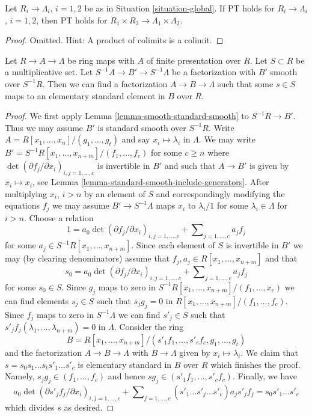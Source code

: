 \begin{lemma}
\label{lemma-product}
Let $R_i \to \Lambda_i$, $i = 1, 2$ be as in Situation \ref{situation-global}.
If PT holds for $R_i \to \Lambda_i$, $i = 1, 2$, then PT holds for
$R_1 \times R_2 \to \Lambda_1 \times \Lambda_2$.
\end{lemma}

\begin{proof}
Omitted. Hint: A product of colimits is a colimit.
\end{proof}

\begin{lemma}
\label{lemma-delocalize-base}
Let $R \to A \to \Lambda$ be ring maps with $A$ of finite presentation
over $R$. Let $S \subset R$ be a multiplicative
set. Let $S^{-1}A \to B' \to S^{-1}\Lambda$ be a factorization with
$B'$ smooth over $S^{-1}R$. Then we can find a factorization
$A \to B \to \Lambda$ such that some $s \in S$ maps to an elementary standard
element in $B$ over $R$.
\end{lemma}

\begin{proof}
We first apply Lemma \ref{lemma-smooth-standard-smooth} to $S^{-1}R \to B'$.
Thus we may assume $B'$ is standard smooth over $S^{-1}R$.
Write $A = R[x_1, \ldots, x_n]/(g_1, \ldots, g_t)$ and say
$x_i \mapsto \lambda_i$ in $\Lambda$. We may write
$B' = S^{-1}R[x_1, \ldots, x_{n + m}]/(f_1, \ldots, f_c)$
for some $c \geq n$ where
$\det(\partial f_j/\partial x_i)_{i, j = 1, \ldots, c}$
is invertible in $B'$ and such that $A \to B'$ is given by $x_i \mapsto x_i$,
see Lemma \ref{lemma-standard-smooth-include-generators}.
After multiplying $x_i$, $i > n$ by an element of $S$ and correspondingly
modifying the equations $f_j$ we may assume $B' \to S^{-1}\Lambda$ maps
$x_i$ to $\lambda_i/1$ for some $\lambda_i \in \Lambda$ for $i > n$.
Choose a relation
$$
1 =
a_0 \det(\partial f_j/\partial x_i)_{i, j = 1, \ldots, c}
+
\sum\nolimits_{j = 1, \ldots, c} a_jf_j
$$
for some $a_j \in S^{-1}R[x_1, \ldots, x_{n + m}]$. Since each element of $S$
is invertible in $B'$ we may (by clearing denominators) assume that
$f_j, a_j \in R[x_1, \ldots, x_{n + m}]$ and that
$$
s_0 = a_0 \det(\partial f_j/\partial x_i)_{i, j = 1, \ldots, c}
+
\sum\nolimits_{j = 1, \ldots, c} a_jf_j
$$
for some $s_0 \in S$. Since $g_j$ maps to zero in
$S^{-1}R[x_1, \ldots, x_{n + m}]/(f_1, \ldots, x_c)$
we can find elements $s_j \in S$ such that $s_j g_j = 0$ in
$R[x_1, \ldots, x_{n + m}]/(f_1, \ldots, f_c)$.
Since $f_j$ maps to zero in $S^{-1}\Lambda$ we can find $s'_j \in S$
such that $s'_j f_j(\lambda_1, \ldots, \lambda_{n + m}) = 0$ in
$\Lambda$. Consider the ring
$$
B = R[x_1, \ldots, x_{n + m}]/
(s'_1f_1, \ldots, s'_cf_c, g_1, \ldots, g_t)
$$
and the factorization $A \to B \to \Lambda$ with $B \to \Lambda$ given by
$x_i \mapsto \lambda_i$. We claim that $s = s_0s_1 \ldots s_ts'_1 \ldots s'_c$
is elementary standard in $B$ over $R$ which finishes the proof.
Namely, $s_j g_j \in (f_1, \ldots, f_c)$ and hence
$sg_j \in (s'_1f_1, \ldots, s'_cf_c)$. Finally, we have
$$
a_0\det(\partial s'_jf_j/\partial x_i)_{i, j = 1, \ldots, c}
+
\sum\nolimits_{j = 1, \ldots, c}
(s'_1 \ldots \hat{s'_j} \ldots s'_c) a_j s'_jf_j
=
s_0s'_1\ldots s'_c
$$
which divides $s$ as desired.
\end{proof}

